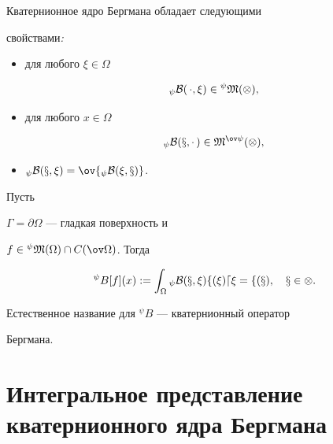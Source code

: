  


\begin{thm} Кватернионное ядро Бергмана обладает следующими 


свойствами{\em :} 


\begin{itemize} 


\item[1.] для любого $\xi\in\Omega$ 


$$ 


{}_\psi\cal B(\,\cdot,\xi)\in{}^\psi\frak M(\Omega), 


$$ 


\item[2.] для любого $x\in\Omega$ 


$$ 


{}_\psi\cal B(x,\cdot\,)\in\frak M^{\ov\psi}(\Omega), 


$$ 


\item[3.] ${}_\psi\cal B(x,\xi)=\ov{{}_\psi\cal B(\xi,x)}$. 


\end{itemize} 


\end{thm} 


 


\begin{thm} Пусть 


$\Gamma=\partial\Omega$ --- гладкая поверхность и 


$f\in{}^\psi\frak M(\Omega)\cap C(\ov\Omega)$. Тогда 


$$ 


{}^\psi B[f](x):=\int_\Omega{}_\psi\cal B(x,\xi)f(\xi)d\xi=f(x), 


\quad x\in\Omega. 


$$ 


\end{thm} 


 


Естественное название для ${}^\psi B$ --- кватернионный оператор 


Бергмана. 


 


\section{Интегральное представление кватернионного ядра Бергмана} 


